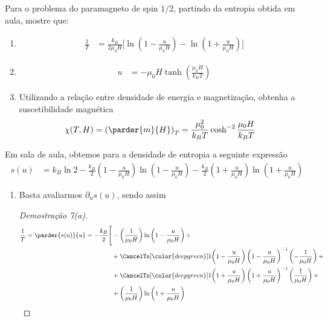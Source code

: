 \begin{prob}
	Para o problema do paramagneto de spin $1/2$, partindo da entropia obtida em aula, mostre que:
	\begin{enumerate}[label=\alph *)]
		\item
		\begin{align}
			\frac{1}{T}&=\frac{k_B}{2\mu_0H}\Biggl[\ln\left(1-\frac{u}{\mu_0H}\right)-\ln\left(1+\frac{u}{\mu_0H}\right)\Biggr]			
		\end{align}
		\item
		\begin{align}
			u&=-\mu_0H\tanh\left(\frac{\mu_0H}{k_BT}\right)			
		\end{align}
		\item Utilizando a relação entre densidade de energia e magnetização, obtenha a suscetibilidade
		magnética
		\begin{align}
			\chi(T,H)&=\left(\parder{m}{H}\right)_T=\frac{\mu_0^2}{k_BT}\cosh^{-2}\frac{\mu_0H}{k_BT}
		\end{align}
	\end{enumerate}
	\begin{sol}Em sala de aula, obtemos para a densidade de entropia a seguinte expressão
		\begin{align}
			s(u)&=k_B\ln 2-\frac{k_B}{2}\left(1-\frac{u}{\mu_0H}\right)\ln\left(1-\frac{u}{\mu_0H}\right)-\frac{k_B}{2}\left(1+\frac{u}{\mu_0H}\right)\ln\left(1+\frac{u}{\mu_0H}\right)
		\end{align}
		\begin{enumerate}[label=\alph *)]
			\item Basta avaliarmos $\partial_u s(u)$, sendo assim
			\begin{proof}[Demostração 7(a)]
				\begin{align}
					\label{eq:7A}
					\begin{split}
						\frac{1}{T} = \parder{s(u)}{u}=-\frac{k_B}{2} \Bigg[ \Bigg. & 
						-\left(\frac{1}{\mu_0H}\right)\ln\left(1-\frac{u}{\mu_0H}\right) + \\
						& + \CancelTo[\color{deepgreen}]{1}{\left(1-\frac{u}{\mu_0H}\right)\left(1-\frac{u}{\mu_0H}\right)^{-1}}\left(-\frac{1}{\mu_0H}\right) + \\
						& +\CancelTo[\color{deepgreen}]{1}{\left(1+\frac{u}{\mu_0H}\right)\left(1+\frac{u}{\mu_0H}\right)^{-1}} \left(\frac{1}{\mu_0H}\right) + \\
						& + \left(\frac{1}{\mu_0H}\right)\ln\left(1+\frac{u}{\mu_0H}\right)

\end{split}
\end{align}
\end{proof}
\end{enumerate}
\end{sol}
\end{prob}
